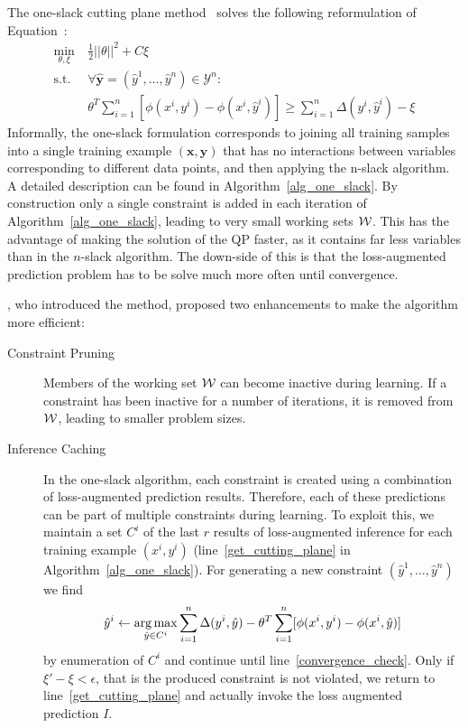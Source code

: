 The one-slack cutting plane method~\citep{joachims2009cutting} solves the
following reformulation of Equation~:
\begin{align}\label{eq:oneslack}
    \min_{\theta, \xi}\ &\frac{1}{2} ||\theta||^2 + C \xi\\
    \text{s.t. }&\forall \hat{\mathbf{y}}=(\hat{y}^1, \dots, \hat{y}^n) \in \mathcal{Y}^n:\\
        &\theta^T \sum_{i=1}^n [\phi(x^i, y^i) - \phi(x^i,
            \hat{y}^i)] \geq \sum_{i=1}^n \Delta(y^i, \hat{y}^i)
            - \xi
\end{align}
Informally, the one-slack formulation corresponds to joining all training
samples into a single training example $(\mathbf{x}, \mathbf{y})$ that has no
interactions between variables corresponding to different data points, and
then applying the n-slack algorithm.
A detailed description can be found in Algorithm~\ref{alg_one_slack}.
%
By construction only a single constraint is added in each iteration of
Algorithm~\ref{alg_one_slack}, leading to very small working sets $\mathcal{W}$.
This has the advantage of making the solution of the QP faster, as it contains far
less variables than in the $n$-slack algorithm. The down-side of this is that
the loss-augmented prediction problem has to be solve much more often until
convergence.

\citet{joachims2009cutting}, who introduced the method, proposed two enhancements
to make the algorithm more efficient:
\begin{description}
    \item[Constraint Pruning] Members of the working set $\mathcal{W}$ can become inactive during learning.
        If a constraint has been inactive for a number of iterations, it is removed from $\mathcal{W}$, leading
        to smaller problem sizes.
    \item[Inference Caching] In the one-slack algorithm, each constraint is
        created using a combination of loss-augmented prediction results.
        Therefore, each of these predictions can be part of multiple
        constraints during learning.
        To exploit this, we maintain a set $C^i$ of the last $r$ results of
        loss-augmented inference for each training example $(x^i, y^i)$
        (line~\ref{get_cutting_plane} in Algorithm~\ref{alg_one_slack}).
        For generating a new constraint $(\hat{y}^1, \dotsc, \hat{y}^n)$ we
        find
        \[ \hat{y}^i \leftarrow \operatorname*{arg\,max}_{\hat{y}\in C^i} \sum_{i=1}^n
            \Delta(y^i, \hat{y}) - \theta^T \sum_{i=1}^n [\phi(x^i, y^i) -
                \phi(x^i, \hat{y})] \]
        by enumeration of $C^i$ and continue until
        line~\ref{convergence_check}.  Only if $\xi' - \xi < \epsilon$, that is
        the produced constraint is not violated, we return to
        line~\ref{get_cutting_plane} and actually invoke the loss augmented
        prediction $I$.
\end{description}

